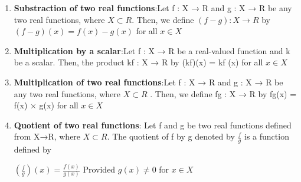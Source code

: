 \documentclass{article}
\begin{document}
\begin{multicols}{2}
\begin{enumerate}
    \item \textbf{Substraction of two real functions}:Let f : X → R and g : X → R be any two real functions, where $X \subset R$. Then, we define $(f - g) : X \rightarrow R$ by $(f - g)(x) = f(x) - g(x)$ for all $x \in X$

    \item \textbf{Multiplication by a scalar}:Let f : X → R be a real-valued function and k be a scalar. Then, the product kf : X → R by (kf)(x) = kf (x) for all $x \in X$

    \item \textbf{Multiplication of two real functions}:Let f : X → R and g : X → R be any two real functions, where $X \subset R$ . Then, we define fg : X → R by fg(x) = f(x) × g(x) for all $x \in X$

    \item \textbf{Quotient of two real functions}: Let f and g be two real functions defined from
X→R, where $X \subset R$. The quotient of f by g denoted by
$\frac{f}{g}$ is a function defined by

$(\frac{f}{g})(x)=\frac{f(x)}{g(x)}$ Provided $g(x) \not = 0$ for $x \in X$

\end{enumerate}
 \end{multicols}
\end{document}
